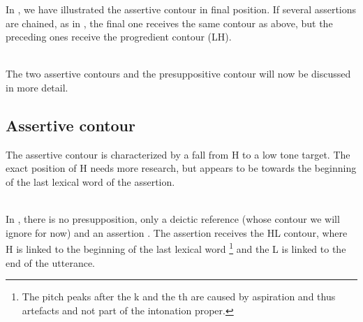 In , we have illustrated the assertive contour in final position. If several assertions are chained, as in , the final one receives the same contour as above, but the preceding ones receive the progredient contour (LH). 

 \\

The two assertive contours and the presuppositive contour will now be discussed in more detail.



\subsection{Assertive contour}\label{sec:phon:Assertivecontour}
The assertive contour is characterized by a fall from H to a low  tone target. The exact position of H needs more research, but appears to be towards the beginning of the last lexical word of the assertion.

 \\

In , there is no presupposition, only a deictic reference (whose contour we will ignore for now) and an assertion . The  assertion receives the HL contour, where H is linked to the beginning of the last lexical word \footnote{The pitch peaks after the k and the th are caused by aspiration and thus artefacts and not part of the intonation proper.} and the L is linked to the end of the utterance.

